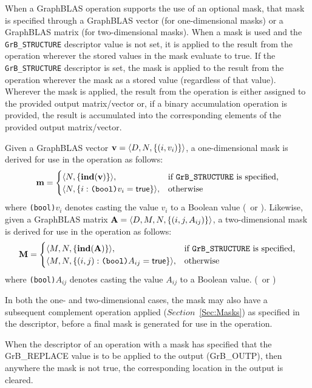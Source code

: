 When a GraphBLAS operation supports the use of an optional mask, that mask is
specified through a GraphBLAS vector (for one-dimensional masks) or
a GraphBLAS matrix (for two-dimensional masks).  When a mask is used and the 
{\tt GrB\_STRUCTURE} descriptor value is not set, it is applied to the result 
from the operation wherever the stored values in the mask evaluate to true.  If
the {\tt GrB\_STRUCTURE} descriptor is set, the mask is applied to the result
from the operation wherever the mask as a stored value (regardless of that value).
Wherever the mask is applied, the result from the operation is either assigned 
to the provided output matrix/vector or, if a binary accumulation operation is 
provided, the result is accumulated into the corresponding elements of the provided 
output matrix/vector. 

Given a GraphBLAS vector ${\bf v} = \langle D,N, \{ (i,v_i) \} \rangle$, a
one-dimensional mask is derived for use in the operation as follows:
\[
{\bf m} = 
\begin{cases}
\langle N, \{ \mathbf{ind}({\bf v}) \} \rangle, & \mbox{if {\tt GrB\_STRUCTURE} is specified,} \\
\langle N, \{ i : \mbox{\tt (bool)}v_i = {\sf true} \} \rangle, & \mbox{otherwise}
\end{cases}
\]
where {\tt (bool)}$v_i$ denotes casting the value $v_i$ to a Boolean value (\true\ or \false).
Likewise, given a GraphBLAS matrix ${\bf A} = \langle D, M, N, \{ (i,j,A_{ij}) \} \rangle$,
a two-dimensional mask is derived for use in the operation as follows:
\[
{\bf M} = 
\begin{cases}
\langle M,N, \{ \mathbf{ind}({\bf A}) \} \rangle, & \mbox{if {\tt GrB\_STRUCTURE} is specified,} \\
\langle M,N, \{ (i,j) : \mbox{\tt (bool)}A_{ij} = {\sf true} \} \rangle, & \mbox{otherwise}
\end{cases}
\]
where {\tt (bool)}$A_{ij}$ denotes casting the value $A_{ij}$ to a Boolean value. 
(\true\ or \false)

In both the one- and two-dimensional cases, the mask may also have a subsequent 
complement operation applied ($Section$~\ref{Sec:Masks}) as specified in the 
descriptor, before a final mask is generated for use in the operation.

When the descriptor of an operation with a mask has specified that 
the {\sf GrB\_REPLACE} value is to be applied to the output ({\sf GrB\_OUTP}),
then anywhere the mask is not {\sf true}, the corresponding location in
the output is cleared.


